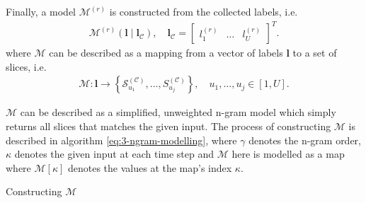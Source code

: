 Finally, a model $\mathcal M^{(r)}$ is constructed from the collected labels, i.e.
\begin{align}
	\mathcal M^{(r)}\left(\bm{l} \mid \bm{l}_{\mathcal C} \right), \quad \bm{l}_{\mathcal C} = \begin{bmatrix} l^{(r)}_1 & \dots & l^{(r)}_U \end{bmatrix}^T.
\end{align}
where $\mathcal M$ can be described as a mapping from a vector of labels $\bm{l}$ to a set of slices, i.e.
\begin{align}\label{eq:3-model-function-definition}
	\mathcal M\colon 	\bm{l}  \rightarrow \left\lbrace \mathcal S^{(\mathcal C)}_{u_1}, \dots, S^{(\mathcal C)}_{u_j}\right\rbrace, \quad u_1,\dots,u_j \in [1,U].
\end{align}

$\mathcal M$ can be described as a simplified, unweighted n-gram model which simply returns all slices that matches the given input. The process of constructing $\mathcal M$ is described in algorithm \ref{eq:3-ngram-modelling}, where $\gamma$ denotes the n-gram order, $\kappa$ denotes the given input at each time step and $\mathcal M$ here is modelled as a map where $\mathcal M\left[\kappa\right]$ denotes the values at the map's index $\kappa$.

\begin{algorithm}
\caption{Constructing $\mathcal M$}
\begin{algorithmic}\label{eq:3-ngram-modelling}
		\ELSE
		\ENDIF
	\ENDFOR
\end{algorithmic}
\end{algorithm}
